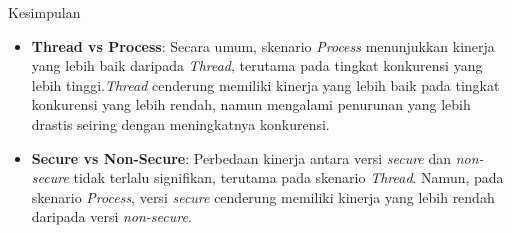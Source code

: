 \documentclass[12pt]{article}
\begin{document}
Kesimpulan
\begin{itemize}
    \item \textbf{Thread vs Process}: Secara umum, skenario \textit{Process} menunjukkan kinerja yang lebih baik daripada \textit{Thread}, terutama pada tingkat konkurensi yang lebih tinggi.\textit{Thread} cenderung memiliki kinerja yang lebih baik pada tingkat konkurensi yang lebih rendah, namun mengalami penurunan yang lebih drastis seiring dengan meningkatnya konkurensi.
    \item \textbf{Secure vs Non-Secure}: Perbedaan kinerja antara versi \textit{secure} dan \textit{non-secure} tidak terlalu signifikan, terutama pada skenario \textit{Thread}. Namun, pada skenario \textit{Process}, versi \textit{secure} cenderung memiliki kinerja yang lebih rendah daripada versi \textit{non-secure}.
\end{itemize}
\end{document}
